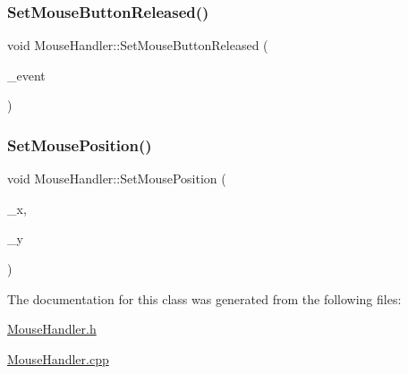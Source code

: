 \mbox{\label{class_mouse_handler_a87c9624aabb7e7377dbf4c2eea544bee}} 
\subsubsection{\texorpdfstring{Set\+Mouse\+Button\+Released()}{SetMouseButtonReleased()}}
{\footnotesize\ttfamily void Mouse\+Handler\+::\+Set\+Mouse\+Button\+Released (\begin{DoxyParamCaption}\item[{S\+D\+L\+\_\+\+Mouse\+Button\+Event}]{\+\_\+event }\end{DoxyParamCaption})}

\mbox{\label{class_mouse_handler_a6b21ab3506b8bd90043f887ec43d93e2}} 
\subsubsection{\texorpdfstring{Set\+Mouse\+Position()}{SetMousePosition()}}
{\footnotesize\ttfamily void Mouse\+Handler\+::\+Set\+Mouse\+Position (\begin{DoxyParamCaption}\item[{int}]{\+\_\+x,  }\item[{int}]{\+\_\+y }\end{DoxyParamCaption})}



The documentation for this class was generated from the following files\+:\begin{DoxyCompactItemize}
\item 
\mbox{\hyperlink{_mouse_handler_8h}{Mouse\+Handler.\+h}}\item 
\mbox{\hyperlink{_mouse_handler_8cpp}{Mouse\+Handler.\+cpp}}\end{DoxyCompactItemize}
